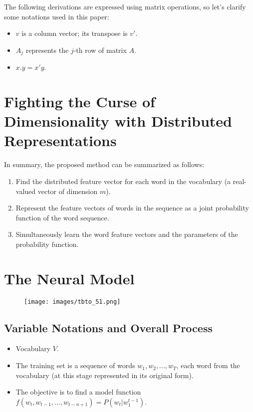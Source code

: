 \documentclass[11p,oneside]{book}
\begin{document}
The following derivations are expressed using matrix operations, so let’s clarify some notations used in this paper:
\begin{itemize}
    \item $v$ is a column vector; its transpose is $v'$.
    \item $A_{j}$ represents the $j$-th row of matrix $A$.
    \item $x.y = x'y$.
\end{itemize}

\section*{Fighting the Curse of Dimensionality with Distributed Representations}

In summary, the proposed method can be summarized as follows:
\begin{enumerate}
    \item Find the distributed feature vector for each word in the vocabulary (a real-valued vector of dimension $m$).
    \item Represent the feature vectors of words in the sequence as a joint probability function of the word sequence.
    \item Simultaneously learn the word feature vectors and the parameters of the probability function.
\end{enumerate}

\section*{The Neural Model}

\begin{figure}[H]
    \centering
    \texttt{[image: images/tbto\_51.png]}
\end{figure}

\subsection*{Variable Notations and Overall Process}
\begin{itemize}
    \item Vocabulary $V$.
    \item The training set is a sequence of words $w_1, w_2, ..., w_T$, each word from the vocabulary (at this stage represented in its original form).
    \item The objective is to find a model function $f(w_t, w_{t-1}, ..., w_{t-n+1}) = P(w_t|w_1^{t-1})$.
\end{itemize}
\end{document}
